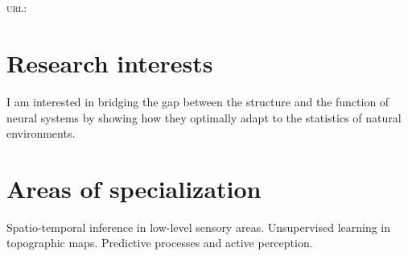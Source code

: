 \documentclass[11pt, a4paper]{article}
\newcommand{\years}[1]{\marginnote{\scriptsize #1}}
\begin{document}
\pagestyle{empty}
\reversemarginpar
\textsf{\Large \Author}\\[1cm]
\Address \\[.2cm]
\textsc{url}: \href{\Website}{\Website}\\
\section*{Research interests}
I am interested in bridging the gap between the structure and the function of neural systems by showing how they optimally adapt to the statistics of natural environments.


\section*{Areas of specialization}
Spatio-temporal inference in low-level sensory areas. %
Unsupervised learning in topographic maps. %
Predictive processes and active perception.

%
%
\end{document}
